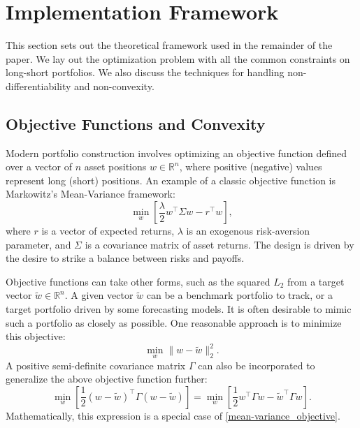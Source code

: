 \documentclass[11pt, letterpaper]{article}
\begin{document}
\section{Implementation Framework}
\label{sec:framework}

This section sets out the theoretical framework used in the remainder of the paper. We lay out the optimization problem with all
the common constraints on long-short portfolios. We also discuss the techniques for handling non-differentiability and
non-convexity.

\subsection{Objective Functions and Convexity}
Modern portfolio construction involves optimizing an objective function defined over a vector of $n$ asset positions
$w \in \mathds{R}^n$, where positive (negative) values represent long (short) positions. An example of a classic objective
function is Markowitz's Mean-Variance framework:
\begin{equation}
    \label{mean-variance_objective}
    \underset{w}{\min} \left[\frac{\lambda}{2} w^\top \Sigma w - r^\top w\right],
\end{equation}
where $r$ is a vector of expected returns, $\lambda$ is an exogenous risk-aversion parameter, and $\Sigma$ is a covariance
matrix of asset returns. The design is driven by the desire to strike a balance between risks and payoffs.

Objective functions can take other forms, such as the squared $L_2$ from a target vector $\tilde{w} \in
\mathds{R}^n$. A given vector $\tilde{w}$ can be a benchmark portfolio to track, or a target portfolio driven by some
forecasting models. It is often desirable to mimic such a portfolio as closely as possible. One reasonable approach is to
minimize this objective:
\begin{equation}
  \label{eq:simple_tracking}
	\underset{w}{\min} \lVert w - \tilde{w}\rVert_2^2.
\end{equation}
A positive semi-definite covariance matrix $\Gamma$ can also be incorporated to generalize the above objective function further:
\begin{equation}
  \label{gamma_matrix}
	\underset{w}{\min}\left[\frac{1}{2} (w - \tilde{w})^\top\Gamma(w - \tilde{w})\right] =
  \underset{w}{\min}\left[\frac{1}{2} w^\top\Gamma w - \tilde{w}^\top\Gamma w \right].
\end{equation}
Mathematically, this expression is a special case of \eqref{mean-variance_objective}.
\end{document}
